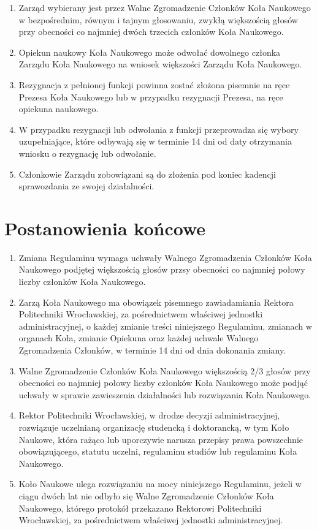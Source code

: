 \documentclass[12pt,a4paper]{article}
\begin{document}
\begin{enumerate}
        \item Zarząd wybierany jest przez Walne Zgromadzenie Członków Koła Naukowego w bezpośrednim, równym i tajnym głosowaniu, zwykłą większością głosów przy obecności co najmniej dwóch trzecich członków Koła Naukowego.
        \item Opiekun naukowy Koła Naukowego może odwołać dowolnego członka Zarządu Koła Naukowego na wniosek większości Zarządu Koła Naukowego.
        \item Rezygnacja z pełnionej funkcji powinna zostać złożona pisemnie na ręce Prezesa Koła Naukowego lub w przypadku rezygnacji Prezesa, na ręce opiekuna naukowego.
        \item W przypadku rezygnacji lub odwołania z funkcji przeprowadza się wybory uzupełniające, które odbywają się w terminie 14 dni od daty otrzymania wniosku o rezygnację lub odwołanie.
        \item Członkowie Zarządu zobowiązani są do złożenia pod koniec kadencji sprawozdania ze swojej działalności.
    \end{enumerate}


\section{Postanowienia końcowe}
    \begin{enumerate}
        \item Zmiana Regulaminu wymaga uchwały Walnego Zgromadzenia Członków Koła Naukowego podjętej większością głosów przsy obecności co najmniej połowy liczby członków Koła Naukowego.
        \item Zarzą Koła Naukowego ma obowiązek pisemnego zawiadamiania Rektora Politechniki Wrocławskiej, za pośrednictwem właściwej jednostki administracyjnej, o każdej zmianie treści niniejszego Regulaminu, zmianach w organach Koła, zmianie Opiekuna oraz każdej uchwale Walnego Zgromadzenia Członków, w terminie 14 dni od dnia dokonania zmiany. 
        \item Walne Zgromadzenie Członków Koła Naukowego większością 2/3 głosów przy obecności co najmniej połowy liczby członków Koła Naukowego może podjąć uchwały w sprawie zawieszenia działalności lub rozwiązania Koła Naukowego.
        \item Rektor Politechniki Wrocławskiej, w drodze decyzji administracyjnej, rozwiązuje uczelnianą organizację studencką i doktorancką, w tym Koło Naukowe, która rażąco lub uporczywie narusza przepisy prawa powszechnie obowiązującego, statutu uczelni, regulaminu studiów lub regulaminu Koła Naukowego.
        \item Koło Naukowe ulega rozwiązaniu na mocy niniejszego Regulaminu, jeżeli w ciągu dwóch lat nie odbyło się Walne Zgromadzenie Członków Koła Naukowego, którego protokół przekazano Rektorowi Politechniki Wrocławskiej, za pośrednictwem właściwej jednostki administracyjnej.
    \end{enumerate}
\end{document}

